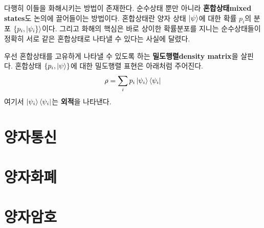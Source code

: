 \documentclass[a4paper,chapter,atbegshi]{oblivoir}
\begin{document}
다행히 이들을 화해시키는 방법이 존재한다. 순수상태 뿐만 아니라 
\textbf{혼합상태\tiny mixed states}도 논의에 끌어들이는 방법이다. 혼합상태란
양자 상태 $\ket{\psi}$에 대한 확률 $p_i$의 분포 $\{p_i,\ket{\psi_i\}}$이다.
그리고 화해의 핵심은 바로 상이한 확률분포를 지니는 순수상태들이 정확히
서로 같은 혼합상태로 나타낼 수 있다는 사실에 달렸다. 

우선 혼합상태를 고유하게 나타낼 수 있도록 하는 \textbf{밀도행렬\tiny density
matrix}을 살핀다. 혼합상태 $\{p_i,\ket{\psi}\}$에 대한 밀도행렬 표현은
아래처럼 주어진다. 
\begin{equation}
  \rho = \sum_i p_i\ket{\psi_i}\bra{\psi_i}
\end{equation}
여기서 $\ket{\psi_i}\bra{\psi_i}$는 \textbf{외적}을 나타낸다.
\chapter{양자통신}
\chapter{양자화폐}
\chapter{양자암호}
\end{document}
